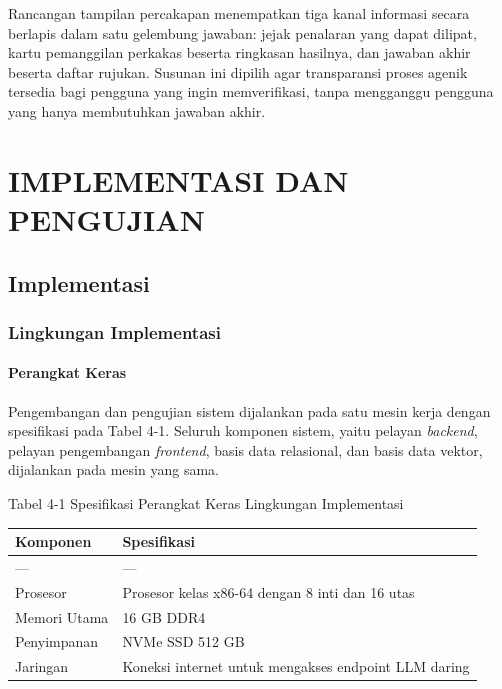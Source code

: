 \documentclass[12pt,a4paper]{article}
\begin{document}
Rancangan tampilan percakapan menempatkan tiga kanal informasi secara berlapis dalam satu gelembung jawaban: jejak penalaran yang dapat dilipat, kartu pemanggilan perkakas beserta ringkasan hasilnya, dan jawaban akhir beserta daftar rujukan. Susunan ini dipilih agar transparansi proses agenik tersedia bagi pengguna yang ingin memverifikasi, tanpa mengganggu pengguna yang hanya membutuhkan jawaban akhir.



\section*{IMPLEMENTASI DAN PENGUJIAN}

\subsection*{Implementasi}

\subsubsection*{Lingkungan Implementasi}

\paragraph*{Perangkat Keras}

Pengembangan dan pengujian sistem dijalankan pada satu mesin kerja dengan spesifikasi pada Tabel 4-1. Seluruh komponen sistem, yaitu pelayan \textit{backend}, pelayan pengembangan \textit{frontend}, basis data relasional, dan basis data vektor, dijalankan pada mesin yang sama.



Tabel 4-1	Spesifikasi Perangkat Keras Lingkungan Implementasi



\begin{table}[h]

\centering

\begin{tabular}{ll}

\toprule

Komponen & Spesifikasi \\

\midrule

--- & --- \\

Prosesor & Prosesor kelas x86-64 dengan 8 inti dan 16 utas \\

Memori Utama & 16 GB DDR4 \\

Penyimpanan & NVMe SSD 512 GB \\

Jaringan & Koneksi internet untuk mengakses endpoint LLM daring \\

\bottomrule

\end{tabular}

\end{table}
\end{document}
